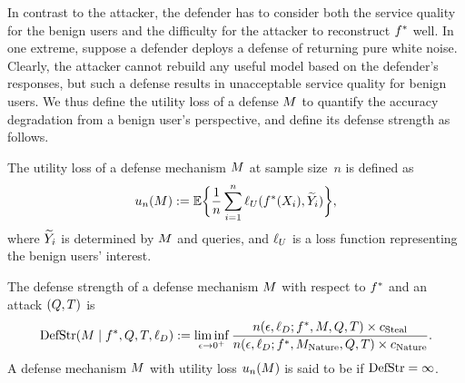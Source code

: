     In contrast to the attacker, the defender has to consider both the service quality for the benign users and the difficulty for the attacker to reconstruct $f^*$ well. 
    In one extreme, suppose a defender deploys a defense of returning pure white noise. Clearly, the attacker cannot rebuild any useful model based on the defender's responses, but such a defense results in unacceptable service quality for benign users. 
    We thus define the utility loss of a defense $M$ to quantify the accuracy degradation from a benign user's perspective, and define its defense strength as follows.
    \begin{definition}\label{def:util}
            The utility loss of a defense mechanism $M$ at sample size~$n$ is defined as
            \begin{align*}
                u_n(M) := \mathbb{E} \biggl\{ \frac{1}{n} \sum_{i=1}^n \ell_U(f^*(X_i), \widetilde{Y}_i) \biggr\},
            \end{align*}
            where $\widetilde{Y}_i$ is determined by $M$ and queries, and $\ell_U$ is a loss function representing the benign users' interest. 
    \end{definition}       
    
    \begin{definition}\label{def:defstr}
        The defense strength of a defense mechanism $M$ with respect to $f^*$ and an attack $(Q, T)$ is  
        \begin{align*}
        \textrm{DefStr}(M\mid f^*,Q,T,\ell_D) 
                 :=   \liminf_{\epsilon \to 0^+} \frac{ n(\epsilon,\ell_D;f^*,M,Q,T) \times c_{\textrm{Steal}} }{n(\epsilon,\ell_D;f^*,M_{\textrm{Nature}},Q,T) \times c_{\textrm{Nature}} }.
        \end{align*}
        A defense mechanism $M$ with utility loss $u_n(M)$ is said to be \eco if $\textrm{DefStr} = \infty$.
    \end{definition}

